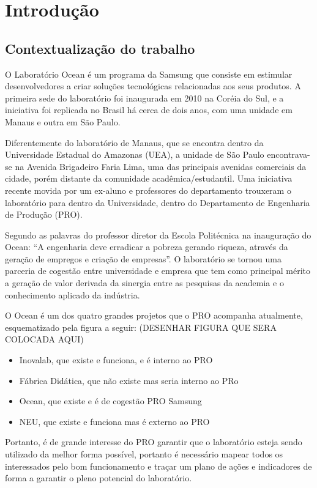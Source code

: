 \chapter[Introdução]{Introdução}
\label{chap:introducao}
\section{Contextualização do trabalho}
\label{cha:contexto}

O Laboratório Ocean é um programa da Samsung que consiste em estimular desenvolvedores a criar soluções tecnológicas relacionadas aos seus produtos. A primeira sede do laboratório foi inaugurada em 2010 na Coréia do Sul, e a iniciativa foi replicada no Brasil há cerca de dois anos, com uma unidade em Manaus e outra em São Paulo.

Diferentemente do laboratório de Manaus, que se encontra dentro da Universidade Estadual do Amazonas (UEA), a unidade de São Paulo encontrava-se na Avenida Brigadeiro Faria Lima, uma das principais avenidas comerciais da cidade, porém distante da comunidade acadêmica/estudantil. Uma iniciativa recente movida por um ex-aluno e professores do departamento trouxeram o laboratório para dentro da Universidade, dentro do Departamento de Engenharia de Produção (PRO).

Segundo as palavras do professor diretor da Escola Politécnica na inauguração do Ocean: “A engenharia deve erradicar a pobreza gerando riqueza, através da geração de empregos e criação de empresas”. O laboratório se tornou uma parceria de cogestão entre universidade e empresa que tem como principal mérito a geração de valor derivada da sinergia entre as pesquisas da academia e o conhecimento aplicado da indústria. 

O Ocean é um dos quatro grandes projetos que o PRO acompanha atualmente, esquematizado pela figura a seguir: (DESENHAR FIGURA QUE SERA COLOCADA AQUI)

\begin{itemize}
\item Inovalab, que existe e funciona, e é interno ao PRO
\item Fábrica Didática, que não existe mas seria interno ao PRo
\item Ocean, que existe e é de cogestão PRO Samsung
\item NEU, que existe e funciona mas é externo ao PRO
\end{itemize}

Portanto, é de grande interesse do PRO garantir que o laboratório esteja sendo utilizado da melhor forma possível, portanto é necessário mapear todos os interessados pelo bom funcionamento e traçar um plano de ações e indicadores de forma a garantir o pleno potencial do laboratório.

